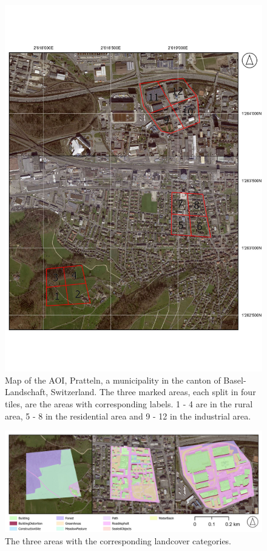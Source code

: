 \begin{figure}[H]
    \centering
    \captionsetup{width=0.8\linewidth}
    \includegraphics[scale=0.9, trim=-1.1cm 2cm 0cm 2cm, clip]{figures/map_aoi.pdf}
    \caption{Map of the AOI, Pratteln, a  municipality in the canton of Basel-Landschaft, Switzerland. 
    The three marked areas, each split in four tiles, are the areas with corresponding labels. 1 - 4 are in the rural area,
    5 - 8 in the residential area and 9 - 12 in the industrial area.}
    \label{fig:aoi_labeled}
\end{figure}

\begin{figure}[H]
    \centering
    \captionsetup{width=0.8\linewidth}
    \includegraphics[width=\linewidth]{figures/map_aoi_category.pdf}
    \caption{The three areas with the corresponding landcover categories.}
    \label{fig:category_areas}
\end{figure}

